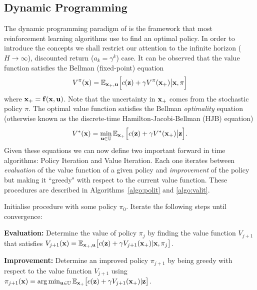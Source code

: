 \subsection{Dynamic Programming}
The dynamic programming paradigm of \cite{Bell57} is the framework that most reinforcement learning algorithms use to find an optimal policy. In order to introduce the concepts we shall restrict our attention to the infinite horizon ($H \rightarrow \infty$), discounted return ($a_k=\gamma^k$) case. It can be observed that the value function satisfies the Bellman (fixed-point) equation
\begin{equation*}
V^\pi(\mathbf{x}) =  \mathbb{E}_{\mathbf{x}_+,\mathbf{u}} \Big[ c(\mathbf{z}) + \gamma V^\pi(\mathbf{x}_+) \big|\mathbf{x},\pi \Big]
\end{equation*}
where $\mathbf{x}_+ = \mathbf{f}(\mathbf{x},\mathbf{u})$. Note that the uncertainty in $\mathbf{x}_+$ comes from the stochastic policy $\pi$. The optimal value function satisfies the Bellman \textit{optimality} equation (otherwise known as the discrete-time Hamilton-Jacobi-Bellman (HJB) equation)
\begin{equation*}
V^*(\mathbf{x}) = \min_{\mathbf{u}\in\mathbb{U}} \mathbb{E}_{\mathbf{x}_+} \Big[c(\mathbf{z}) + \gamma V^*(\mathbf{x}_+) \big|\mathbf{z}\Big].
\end{equation*}
Given these equations we can now define two important forward in time algorithms: Policy Iteration and Value Iteration. Each one iterates between \textit{evaluation} of the value function of a given policy and \textit{improvement} of the policy but making it ``greedy" with respect to the current value function. These procedures are described in Algorithms~\ref{algo:polit} and \ref{algo:valit}.


%

\begin{algo} \label{algo:polit}
Initialise procedure with some policy $\pi_0$. Iterate the following steps until convergence: 

\textbf{Evaluation:} Determine the value of policy $\pi_j$ by finding the value function $V_{j+1}$ that satisfies $V_{j+1}(\mathbf{x}) = \mathbb{E}_{\mathbf{x}_+,\mathbf{u}} \big[c(\mathbf{z}) + \gamma V_{j+1}(\mathbf{x}_+) |\mathbf{x},\pi_j \big]$.

\textbf{Improvement:} Determine an improved policy $\pi_{j+1}$ by being greedy with respect to the value function $V_{j+1}$ using $\pi_{j+1}(\mathbf{x}) = \arg\min_{\mathbf{u}\in\mathbb{U}} \mathbb{E}_{\mathbf{x}_+} \big[ c(\mathbf{z}) + \gamma V_{j+1}(\mathbf{x}_+)|\mathbf{z}\big]$.
\end{algo}

